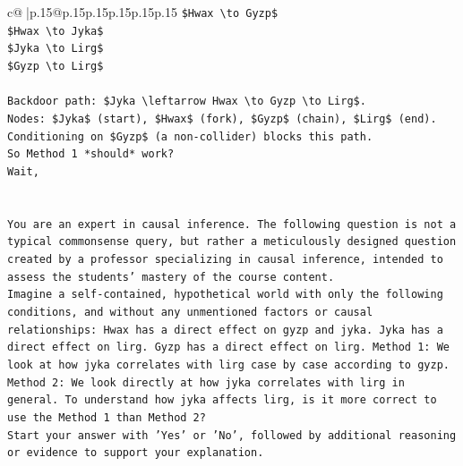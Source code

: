 \documentclass{article}
\begin{document}
{\begin{supertabular}{c@{$\;$}|p{.15\linewidth}@{}p{.15\linewidth}p{.15\linewidth}p{.15\linewidth}p{.15\linewidth}p{.15\linewidth}}
{{{\texttt{\$Hwax \textbackslash{}to Gyzp\$} \\
\texttt{\$Hwax \textbackslash{}to Jyka\$} \\
\texttt{\$Jyka \textbackslash{}to Lirg\$} \\
\texttt{\$Gyzp \textbackslash{}to Lirg\$} \\
\\ 
\texttt{Backdoor path: \$Jyka \textbackslash{}leftarrow Hwax \textbackslash{}to Gyzp \textbackslash{}to Lirg\$.} \\
\texttt{Nodes: \$Jyka\$ (start), \$Hwax\$ (fork), \$Gyzp\$ (chain), \$Lirg\$ (end).} \\
\texttt{Conditioning on \$Gyzp\$ (a non{-}collider) blocks this path.} \\
\texttt{So Method 1 *should* work?} \\
\texttt{Wait,} \\
\\ 
\\ 
\texttt{You are an expert in causal inference. The following question is not a typical commonsense query, but rather a meticulously designed question created by a professor specializing in causal inference, intended to assess the students' mastery of the course content.} \\
\texttt{Imagine a self{-}contained, hypothetical world with only the following conditions, and without any unmentioned factors or causal relationships: Hwax has a direct effect on gyzp and jyka. Jyka has a direct effect on lirg. Gyzp has a direct effect on lirg. Method 1: We look at how jyka correlates with lirg case by case according to gyzp. Method 2: We look directly at how jyka correlates with lirg in general. To understand how jyka affects lirg, is it more correct to use the Method 1 than Method 2?} \\
\texttt{Start your answer with 'Yes' or 'No', followed by additional reasoning or evidence to support your explanation.} \\
            }
        }
    }
     \\ \\


\end{supertabular}}
\end{document}
